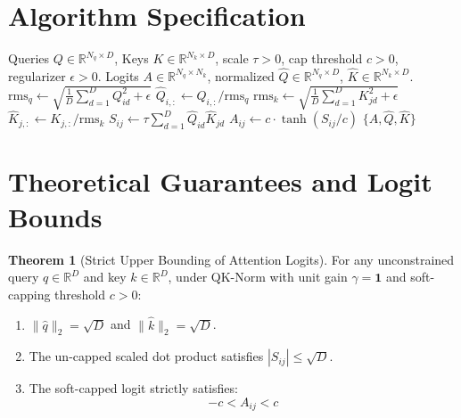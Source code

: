 \documentclass[11pt,a4paper]{article}
\theoremstyle{definition}
\newtheorem{theorem}{Theorem}[section]
\begin{document}
\section{Algorithm Specification}

\begin{algorithm}[H]
\caption{QK-Norm and Attention Logit Soft-Capping}
\label{alg:qk_norm_soft_cap}
\begin{algorithmic}[1]
\Require Queries $Q \in \mathbb{R}^{N_q \times D}$, Keys $K \in \mathbb{R}^{N_k \times D}$, scale $\tau > 0$, cap threshold $c > 0$, regularizer $\epsilon > 0$.
\Ensure Logits $A \in \mathbb{R}^{N_q \times N_k}$, normalized $\hat{Q} \in \mathbb{R}^{N_q \times D}$, $\hat{K} \in \mathbb{R}^{N_k \times D}$.
    \State $\text{rms}_q \gets \sqrt{\frac{1}{D}\sum_{d=1}^D Q_{id}^2 + \epsilon}$
    \State $\hat{Q}_{i, :} \gets Q_{i, :} / \text{rms}_q$
\EndFor
{}
    \State $\text{rms}_k \gets \sqrt{\frac{1}{D}\sum_{d=1}^D K_{jd}^2 + \epsilon}$
    \State $\hat{K}_{j, :} \gets K_{j, :} / \text{rms}_k$
\EndFor
{}
        \State $S_{ij} \gets \tau \sum_{d=1}^D \hat{Q}_{id} \hat{K}_{jd}$
        \State $A_{ij} \gets c \cdot \tanh(S_{ij} / c)$
    \EndFor
\EndFor
\State \Return $\{A, \hat{Q}, \hat{K}\}$
\end{algorithmic}
\end{algorithm}

\section{Theoretical Guarantees and Logit Bounds}

\begin{theorem}[Strict Upper Bounding of Attention Logits]
For any unconstrained query $q \in \mathbb{R}^D$ and key $k \in \mathbb{R}^D$, under QK-Norm with unit gain $\gamma = \mathbf{1}$ and soft-capping threshold $c > 0$:
\begin{enumerate}
    \item $\|\hat{q}\|_2 = \sqrt{D}$ and $\|\hat{k}\|_2 = \sqrt{D}$.
    \item The un-capped scaled dot product satisfies $|S_{ij}| \le \sqrt{D}$.
    \item The soft-capped logit strictly satisfies:
    \begin{equation}
    -c < A_{ij} < c
    \end{equation}
\end{enumerate}
\end{theorem}
\end{document}
